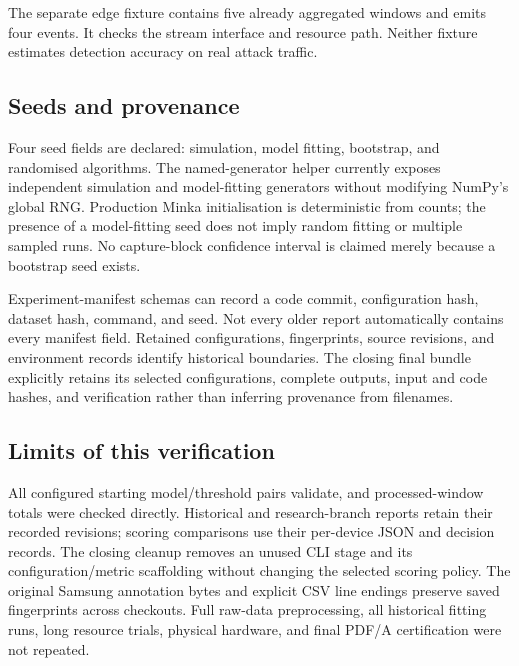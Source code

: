 The separate edge fixture contains five already aggregated windows and emits
four events. It checks the stream interface and resource path. Neither fixture
estimates detection accuracy on real attack traffic.

\subsection{Seeds and provenance}

Four seed fields are declared: simulation, model fitting, bootstrap, and
randomised algorithms. The named-generator helper currently exposes independent
simulation and model-fitting generators without modifying NumPy's global RNG.
Production Minka initialisation is deterministic from counts; the presence of a
model-fitting seed does not imply random fitting or multiple sampled runs.
No capture-block confidence
interval is claimed merely because a bootstrap seed exists.

Experiment-manifest schemas can record a code commit, configuration hash,
dataset hash, command, and seed. Not every older report automatically contains
every manifest field. Retained configurations, fingerprints, source revisions,
and environment records identify historical boundaries. The closing final
bundle explicitly retains its selected configurations, complete outputs, input
and code hashes, and verification rather than inferring provenance from filenames.

\subsection{Limits of this verification}

All configured starting model/threshold pairs validate, and processed-window
totals were checked directly. Historical and research-branch reports retain
their recorded revisions; scoring comparisons use their per-device JSON and
decision records. The closing cleanup removes an unused CLI stage and its
configuration/metric scaffolding without changing the selected scoring policy.
The original Samsung annotation bytes and explicit CSV line endings preserve
saved fingerprints across checkouts. Full raw-data preprocessing,
all historical fitting runs, long resource trials, physical hardware, and final
PDF/A certification were not repeated.

